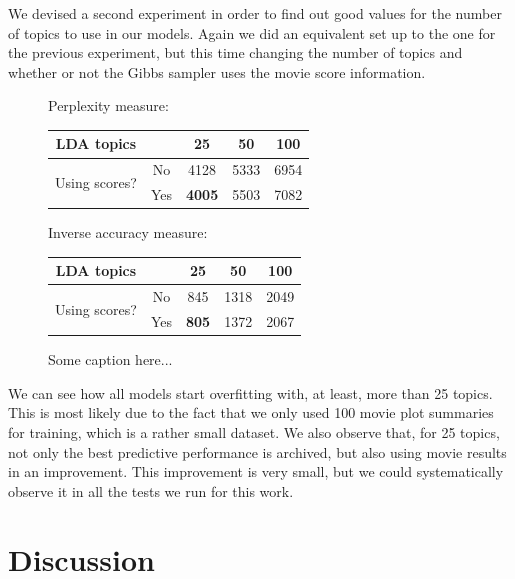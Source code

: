 \documentclass[a4paper,10pt]{article}
\begin{document}
We devised a second experiment in order to find out good values for the number of topics to use in our models. Again we did an equivalent set up to the one for the previous experiment, but this time changing the number of topics and whether or not the Gibbs sampler uses the movie score information.

\begin{figure}[ht!]
\label{figure:K}
	Perplexity measure:
	
	\begin{center}
	\begin{tabular}{cc|ccc}
		LDA topics      & & 25 & 50 & 100 \\ \hline
		\multirow{2}{*}{Using scores?} & No  & 4128 & 5333 & 6954 \\
		                               & Yes & \textbf{4005} & 5503 & 7082 \\
	\end{tabular}
	\end{center}
	
	Inverse accuracy measure:
	
	\begin{center}
	\begin{tabular}{cc|ccc}
		LDA topics      & & 25 & 50 & 100 \\ \hline
		\multirow{2}{*}{Using scores?} & No  & 845 & 1318 & 2049 \\
		                               & Yes & \textbf{805} & 1372 & 2067 \\
	\end{tabular}
	\end{center}
\caption{Some caption here...}
\end{figure}

We can see how all models start overfitting with, at least, more than 25 topics. This is most likely due to the fact that we only used 100 movie plot summaries for training, which is a rather small dataset. We also observe that, for 25 topics, not only the best predictive performance is archived, but also using movie results in an improvement. This improvement is very small, but we could systematically observe it in all the tests we run for this work. 

\section{Discussion}
\end{document}
